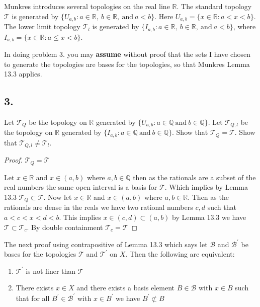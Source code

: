 \documentclass{amsart}
\theoremstyle{plain}
\theoremstyle{definition}
\theoremstyle{remark}
\begin{document}
\vspace{.15in}

Munkres introduces several topologies on the real line $\mathbb R$. The standard topology $\mathcal T$ is generated by $\{ U_{a, b} : a\in \mathbb R, \ b\in \mathbb R, \ \mbox{and} \ a < b\}$. Here $U_{a, b} = \{ x\in \mathbb R : a < x < b\}$. The lower limit topology $\mathcal T _l$ is generated by $\{ I_{a, b} : a\in \mathbb R, \ b\in \mathbb R, \ \mbox{and} \ a < b\}$, where $I_{a, b} = \{ x\in \mathbb R : a \le x < b\}$.

In doing problem 3. you may {\bfseries assume} without proof that the sets I have chosen to generate the topologies are bases for the topologies, so that Munkres Lemma 13.3 applies.



\vspace{.15in}

\noindent
\subsection*{3.}  Let $\mathcal T _Q$ be the topology on $\mathbb R$ generated by $\{ U_{a, b} : a\in \mathbb Q \ \mbox{and} \ b\in \mathbb Q \}$. Let $\mathcal T _{Q,l}$ be the topology on $\mathbb R$ generated by $\{ I_{a, b} : a\in \mathbb Q \ \mbox{and} \ b\in \mathbb Q \}$. Show that $\mathcal T _Q = \mathcal T$. Show that $\mathcal T _{Q,l} \ne \mathcal T _l$.

\begin{proof}{${\mathcal{T}_Q=\mathcal{T}}$}
    
    Let $x\in \mathbb{R}$ and $x\in (a,b)$ where $a,b\in \mathbb{Q}$ then as the rationals are a subset of the real numbers the same open interval is a basis for $\mathcal {T}$. Which implies by Lemma 13.3 $\mathcal{T}_Q\subset \mathcal{T}$.
    Now let $x\in \mathbb{R}$ and $x\in (a,b)$ where $a,b \in \mathbb{R}$. Then as the rationals are dense in the reals we have two rational numbers $c,d$ such that $a<c<x<d<b$. This implies $x\in (c,d)\subset (a,b)$ by Lemma 13.3 we have $\mathcal T\subset \mathcal T_c$.
    By double containment $\mathcal T_c= \mathcal T$
 

\end{proof}
\vspace{.15in}

The next proof using contrapositive of Lemma 13.3 which says let $\mathcal{B}$ and $\mathcal{B}^\prime$ be bases for the topologies $\mathcal{T}$ and $\mathcal{T}^\prime$ on $X$. Then the following are equivalent:
\begin{enumerate}
    \item $\mathcal{T}^\prime$ is not finer than $\mathcal{T}$
    \item There exists $x\in X$ and there exists a basis element $B\in \mathcal{B}$ with $x\in B$ such that for all $B^\prime\in \mathcal{B}^\prime$ with $x\in B^\prime$ we have $B^\prime \not \subset B$
\end{enumerate}
\end{document}
